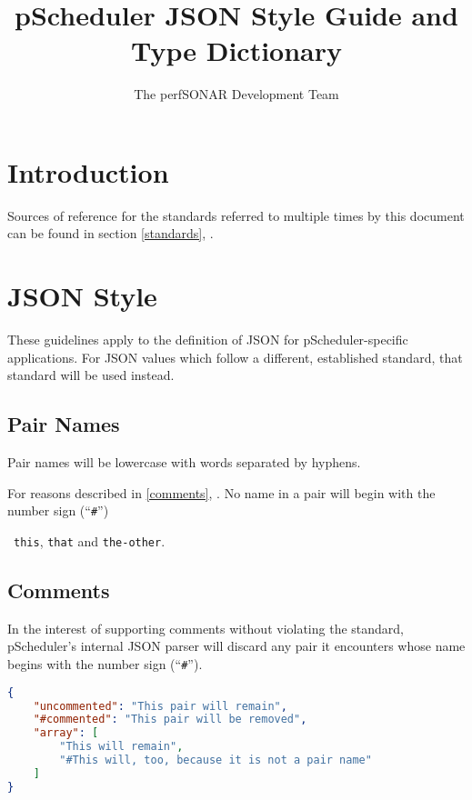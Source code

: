 \documentclass[10pt]{article}
\title{pScheduler JSON Style Guide and Type Dictionary}
\author{The perfSONAR Development Team}
\begin{document}
\maketitle

%
%

\def\source#1#2{{\bf #1:}  \url{#2}}


%
%

\section{Introduction}

Sources of reference for the standards referred to multiple times by
this document can be found in section \autoref{standards}, {\it
  }.


%
%

\section{JSON Style}

These guidelines apply to the definition of JSON for
pScheduler-specific applications.  For JSON values which follow a
different, established standard, that standard will be used instead.

\subsection{Pair Names}
Pair names will be lowercase with words separated by hyphens.

For reasons described in \autoref{comments}, {\it
  }.  No name in a pair will begin with the number
sign (``{\tt \#}'')

\example\ {\tt this}, {\tt that} and {\tt the-other}.


\subsection{Comments}\label{comments}

In the interest of supporting comments without violating the standard,
pScheduler's internal JSON parser will discard any pair it encounters
whose name begins with the number sign (``{\tt \#}'').

\example
\begin{lstlisting}[language=json]
{
    "uncommented": "This pair will remain",
    "#commented": "This pair will be removed",
    "array": [
        "This will remain",
        "#This will, too, because it is not a pair name"
    ]
}
\end{lstlisting}
\end{document}
